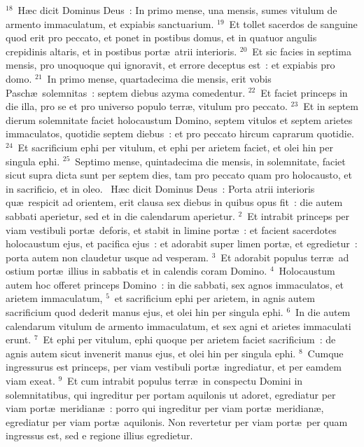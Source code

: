 ${}^{18}$~H\ae c dicit Dominus Deus~: In primo mense, una mensis, sumes vitulum de armento immaculatum, et expiabis sanctuarium.
${}^{19}$~Et tollet sacerdos de sanguine quod erit pro peccato, et ponet in postibus domus, et in quatuor angulis crepidinis altaris, et in postibus port\ae\ atrii interioris.
${}^{20}$~Et sic facies in septima mensis, pro unoquoque qui ignoravit, et errore deceptus est~: et expiabis pro domo.
${}^{21}$~In primo mense, quartadecima die mensis, erit vobis Pasch\ae\ solemnitas~: septem diebus azyma comedentur.
${}^{22}$~Et faciet princeps in die illa, pro se et pro universo populo terr\ae , vitulum pro peccato.
${}^{23}$~Et in septem dierum solemnitate faciet holocaustum Domino, septem vitulos et septem arietes immaculatos, quotidie septem diebus~: et pro peccato hircum caprarum quotidie.
${}^{24}$~Et sacrificium ephi per vitulum, et ephi per arietem faciet, et olei hin per singula ephi.
${}^{25}$~Septimo mense, quintadecima die mensis, in solemnitate, faciet sicut supra dicta sunt per septem dies, tam pro peccato quam pro holocausto, et in sacrificio, et in oleo.
~H\ae c dicit Dominus Deus~: Porta atrii interioris qu\ae\ respicit ad orientem, erit clausa sex diebus in quibus opus fit~: die autem sabbati aperietur, sed et in die calendarum aperietur.
${}^{2}$~Et intrabit princeps per viam vestibuli port\ae\ deforis, et stabit in limine port\ae~: et facient sacerdotes holocaustum ejus, et pacifica ejus~: et adorabit super limen port\ae , et egredietur~: porta autem non claudetur usque ad vesperam.
${}^{3}$~Et adorabit populus terr\ae\ ad ostium port\ae\ illius in sabbatis et in calendis coram Domino.
${}^{4}$~Holocaustum autem hoc offeret princeps Domino~: in die sabbati, sex agnos immaculatos, et arietem immaculatum,
${}^{5}$~et sacrificium ephi per arietem, in agnis autem sacrificium quod dederit manus ejus, et olei hin per singula ephi.
${}^{6}$~In die autem calendarum vitulum de armento immaculatum, et sex agni et arietes immaculati erunt.
${}^{7}$~Et ephi per vitulum, ephi quoque per arietem faciet sacrificium~: de agnis autem sicut invenerit manus ejus, et olei hin per singula ephi.
${}^{8}$~Cumque ingressurus est princeps, per viam vestibuli port\ae\ ingrediatur, et per eamdem viam exeat.
${}^{9}$~Et cum intrabit populus terr\ae\ in conspectu Domini in solemnitatibus, qui ingreditur per portam aquilonis ut adoret, egrediatur per viam port\ae\ meridian\ae~: porro qui ingreditur per viam port\ae\ meridian\ae , egrediatur per viam port\ae\ aquilonis. Non revertetur per viam port\ae\ per quam ingressus est, sed e regione illius egredietur.
